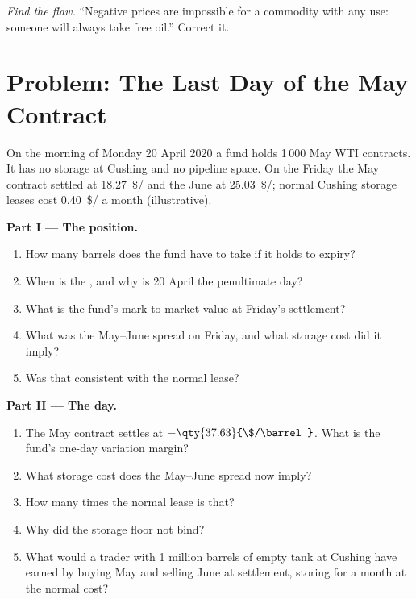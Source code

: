 \begin{exercise}[$\star\star\star$]\label{exo:m3:crude-oil:8}
\emph{Find the flaw.} ``Negative prices are impossible for a commodity with any use:
someone will always take free oil.'' Correct it.
\end{exercise}

\section{Problem: The Last Day of the May Contract}

\begin{problem}\label{pb:m3:crude-oil:1}
On the morning of Monday 20 April 2020 a fund holds 1\,000 May WTI contracts. It has
no storage at Cushing and no pipeline space. On the Friday the May contract settled
at \qty{18.27}{\$/\barrel} and the June at \qty{25.03}{\$/\barrel}; normal Cushing storage
leases cost \qty{0.40}{\$/\barrel} a month (illustrative).

\medskip\noindent\textbf{Part I --- The position.}
\begin{enumerate}
\item How many barrels does the fund have to take if it holds to expiry?
\item When is the , and why is 20 April the penultimate day?
\item What is the fund's mark-to-market value at Friday's settlement?
\item What was the May--June spread on Friday, and what storage cost did it imply?
\item Was that consistent with the normal lease?
\end{enumerate}

\medskip\noindent\textbf{Part II --- The day.}
\begin{enumerate}[resume]
\item The May contract settles at $-\qty{37.63}{\$/\barrel}$. What is the fund's
one-day variation margin?
\item What storage cost does the May--June spread now imply?
\item How many times the normal lease is that?
\item Why did the storage floor not bind?
\item What would a trader with 1 million barrels of empty tank at Cushing have earned
by buying May and selling June at settlement, storing for a month at the normal cost?
\end{enumerate}


\end{problem}

